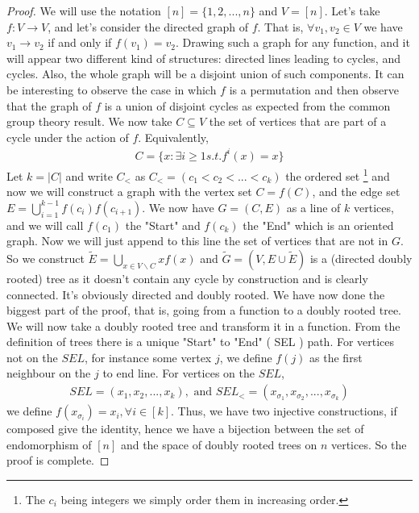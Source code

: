 \begin{proof}
We will use the notation $[n] = \{1, 2, ..., n\}$ and $V = [n]$.
Let's take $f:V \longrightarrow V$, and let's consider the directed graph of $f$. That is, $\forall v_1, v_2 \in V$ we have $v_1 \rightarrow v_2$ if and only if $f(v_1) = v_2$.
Drawing such a graph for any function, and it will appear two different kind of structures: directed lines leading to cycles, and cycles. 
Also, the whole graph will be a disjoint union of such components.
It can be interesting to observe the case in which $f$ is a permutation and then observe that the graph of $f$ is a union of disjoint cycles as expected from the common group theory result.
\newline
We now take $C \subseteq V$ the set of vertices that are part of a cycle under the action of $f$. Equivalently,
\begin{align*}
    C = \{ x : \exists i \geq 1 s. t. f^i(x) = x \}
\end{align*}
Let $k = |C|$ and write $C_<$ as $C_< = (c_1 < c_2 <...<c_k)$ the ordered set 
\footnote{The $c_i$ being integers we simply order them in increasing order.}
and now we will construct a graph with the vertex set $C = f(C)$, and the edge set $E = \bigcup_{i=1}^{k-1} f(c_i)f(c_{i+1})$. We now have $G=(C, E)$ as a line of $k$ vertices, and we will call $f(c_1)$ the "Start" and $f(c_k)$ the "End" which is an oriented graph.
\newline
Now we will just append to this line the set of vertices that are not in $G$. So we construct $\tilde{E} = \bigcup_{x \in V \backslash C} x f(x)$ and $\tilde{G} = (V, E\cup\tilde{E})$ is a (directed doubly rooted) tree as it doesn't contain any cycle by construction and is clearly connected. It's obviously directed and  doubly rooted.
We have now done the biggest part of the proof, that is, going from a function to a doubly rooted tree.
\newline
We will now take a doubly rooted tree and transform it in a function. From the definition of trees there is a unique "Start" to "End" ( SEL ) path.
\newline
For vertices not on the $SEL$, for instance some vertex $j$, we define $f(j)$ as the first neighbour on the $j$ to end line.
\newline
For vertices on the $SEL$, 
\begin{align}
	SEL = (x_1, x_2, ..., x_k), \text{ and } SEL_< = (x_{\sigma_1}, x_{\sigma_2}, ..., x_{\sigma_k}) 
\end{align}
we define $f(x_{\sigma_i}) = x_i, \forall i \in [k]$.
\newline
Thus, we have two injective constructions, if composed give the identity, hence we have a bijection between the set of endomorphism of $[n]$ and the space of doubly rooted trees on $n$ vertices. So the proof is complete.
\end{proof}
